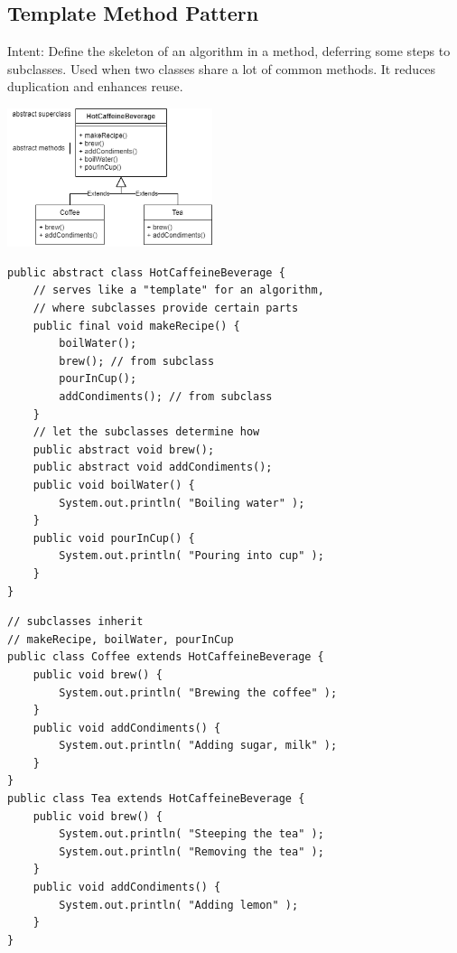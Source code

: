 \documentclass[8pt, letterpaper, titlepage]{article}
\begin{document}
\begin{multicols*}{2}
    \subsection*{Template Method Pattern}
    Intent: Define the skeleton of an algorithm in a method, deferring some steps to subclasses.
    Used when two classes share a lot of common methods. It reduces duplication and enhances reuse. \\
    \begin{center} 
        \includegraphics[width=6cm]{template.png}
    \end{center}

    \begin{lstlisting}
public abstract class HotCaffeineBeverage {
    // serves like a "template" for an algorithm,
    // where subclasses provide certain parts
    public final void makeRecipe() {
        boilWater();
        brew(); // from subclass
        pourInCup();
        addCondiments(); // from subclass
    }
    // let the subclasses determine how
    public abstract void brew();
    public abstract void addCondiments();
    public void boilWater() {
        System.out.println( "Boiling water" );
    }
    public void pourInCup() {
        System.out.println( "Pouring into cup" );
    }
}           
    \end{lstlisting}

    \begin{lstlisting}
// subclasses inherit
// makeRecipe, boilWater, pourInCup
public class Coffee extends HotCaffeineBeverage {
    public void brew() {
        System.out.println( "Brewing the coffee" );
    }
    public void addCondiments() {
        System.out.println( "Adding sugar, milk" );
    }
}
public class Tea extends HotCaffeineBeverage {
    public void brew() {
        System.out.println( "Steeping the tea" );
        System.out.println( "Removing the tea" );
    }
    public void addCondiments() {
        System.out.println( "Adding lemon" );
    }
}
                
    \end{lstlisting}

\end{multicols*}
\end{document}
